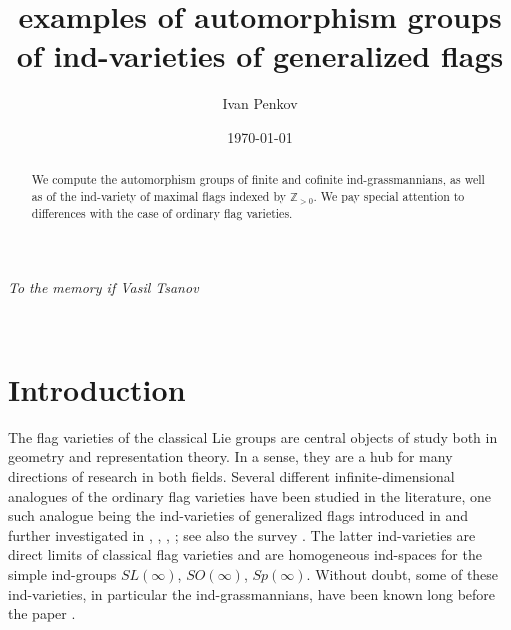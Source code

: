 \documentclass[11pt]{amsart}
\author[Ivan Penkov]{\;Ivan Penkov}
\numberwithin{equation}{section}
\theoremstyle{plain}
\theoremstyle{remark}
\theoremstyle{remark}
\theoremstyle{construction}
\begin{document}


\ifx\useHugeSize\undefined
\else
\Huge
\fi

\relax


\title{ examples of automorphism groups of ind-varieties of generalized flags}
\begin{center}
\it To the memory if Vasil Tsanov
\end{center}

\date{ \today }


\begin{abstract} We compute the automorphism groups of finite and cofinite ind-grassmannians, as well as of the ind-variety of maximal flags indexed by $\mathbb Z_{>0}$. We pay special attention to differences with the case of ordinary flag varieties. 
\end{abstract}
\maketitle













\medskip{} \\

\section{Introduction}
The flag varieties of the classical Lie groups are central objects of study both in geometry and representation theory. In a sense, they are a hub for many directions of research in both fields. Several different infinite-dimensional analogues of the ordinary flag varieties have been studied in the literature, one such analogue being the ind-varieties of generalized flags introduced in \cite{DP} and further investigated in \cite{PT}, \cite{IPW}, \cite{FP1}, \cite{FP2}; see also the survey \cite{IP}. The latter ind-varieties are direct limits of classical flag varieties and are homogeneous ind-spaces for the simple ind-groups $SL(\infty)$, $SO(\infty)$, $Sp(\infty)$. Without doubt, some of these ind-varieties, in particular the ind-grassmannians, have been known long before the paper \cite{DP}. 
\end{document}
